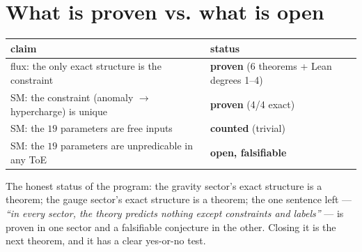 \documentclass[11pt]{article}
\begin{document}
\section{What is proven vs. what is open}

\begin{center}
\begin{tabular}{ll}
\toprule
claim & status \\
\midrule
flux: the only exact structure is the constraint & \textbf{proven} (6 theorems + Lean degrees 1--4) \\
SM: the constraint (anomaly $\to$ hypercharge) is unique & \textbf{proven} (4/4 exact) \\
SM: the $19$ parameters are free inputs & \textbf{counted} (trivial) \\
SM: the $19$ parameters are unpredicable in any ToE & \textbf{open, falsifiable} \\
\bottomrule
\end{tabular}
\end{center}

The honest status of the program: the gravity sector's exact structure is a theorem;
the gauge sector's exact structure is a theorem; the one sentence left --- \emph{``in
every sector, the theory predicts nothing except constraints and labels''} --- is proven
in one sector and a falsifiable conjecture in the other. Closing it is the next
theorem, and it has a clear yes-or-no test.
\end{document}
